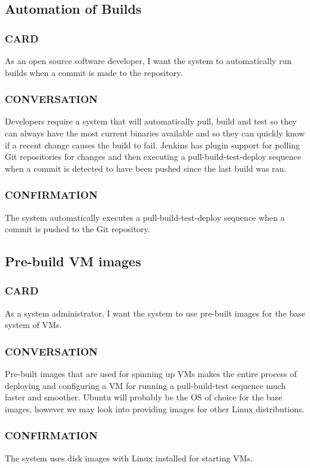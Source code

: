 \documentclass[10pt,letterpaper,onecolumn,journal]{IEEEtran}
\begin{document}
\subsection{Automation of Builds}
\subsubsection{CARD}
As an open source software developer, I want the system to automatically run builds when a commit is made to the repository.
\subsubsection{CONVERSATION}
Developers require a system that will automatically pull, build and test so they can always have the most current
binaries available and so they can quickly know if a recent change causes the build to fail. Jenkins has plugin support for polling
Git repositories for changes and then executing a pull-build-test-deploy sequence when a commit is detected to have been pushed since
the last build was ran.
\subsubsection{CONFIRMATION}
The system automatically executes a pull-build-test-deploy sequence when a commit is pushed to the Git repository.

\subsection{Pre-build VM images}
\subsubsection{CARD}
As a system administrator, I want the system to use pre-built images for the base system of VMs.
\subsubsection{CONVERSATION}
Pre-built images that are used for spinning up VMs makes the entire process of deploying and configuring a VM
for running a pull-build-test sequence much faster and smoother. Ubuntu will probably be the OS of choice for the base images, however
we may look into providing images for other Linux distributions.
\subsubsection{CONFIRMATION}
The system uses disk images with Linux installed for starting VMs.
\clearpage
\end{document}
